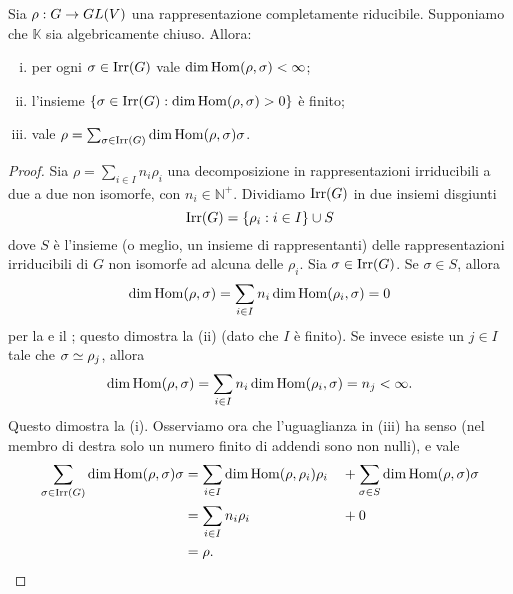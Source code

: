 \begin{proposition}
Sia $\rho:G\to GL(V)$ una rappresentazione completamente riducibile. Supponiamo che $\mathbb{K}$ sia algebricamente chiuso. Allora:
\begin{enumerate}[(i)]
\item per ogni $\sigma\in\operatorname{Irr}(G)$ vale $\dim\operatorname{Hom}(\rho,\sigma)<\infty$;
\item l'insieme $\{\sigma\in\operatorname{Irr}(G):\dim\operatorname{Hom}(\rho,\sigma)>0\}$ è finito;
\item vale $\rho=\sum_{\sigma\in\operatorname{Irr}(G)}\dim\operatorname{Hom}(\rho,\sigma)\sigma$.
\end{enumerate}
\end{proposition}
\begin{proof}
Sia $\rho=\sum_{i\in I}n_i\rho_i$ una decomposizione in rappresentazioni irriducibili a due a due non isomorfe, con $n_i\in\mathbb{N^+}$. Dividiamo $\operatorname{Irr}(G)$ in due insiemi disgiunti
$$
\operatorname{Irr}(G)=\{\rho_i:i\in I\}\cup S
$$
dove $S$ è l'insieme (o meglio, un insieme di rappresentanti) delle rappresentazioni irriducibili di $G$ non isomorfe ad alcuna delle $\rho_i$. Sia $\sigma\in\operatorname{Irr}(G)$. Se $\sigma\in S$, allora
$$
\dim\operatorname{Hom}(\rho,\sigma)=\sum_{i\in I}n_i\dim\operatorname{Hom}(\rho_i,\sigma)=0
$$
per la  e il ; questo dimostra la (ii) (dato che $I$ è finito). Se invece esiste un $j\in I$ tale che $\sigma\simeq\rho_j$, allora
$$
\dim\operatorname{Hom}(\rho,\sigma)=\sum_{i\in I}n_i\dim\operatorname{Hom}(\rho_i,\sigma)=n_j<\infty.
$$
Questo dimostra la (i). Osserviamo ora che l'uguaglianza in (iii) ha senso (nel membro di destra solo un numero finito di addendi sono non nulli), e vale
\begin{alignat*}{2}
\sum_{\sigma\in\operatorname{Irr}(G)}\dim\operatorname{Hom}(\rho,\sigma)\sigma&=\sum_{i\in I}\dim\operatorname{Hom}(\rho,\rho_i)\rho_i&&+\sum_{\sigma\in S}\dim\operatorname{Hom}(\rho,\sigma)\sigma\\
&=\sum_{i\in I}n_i\rho_i&&+0\\
&=\rho.
\end{alignat*}
\end{proof}

